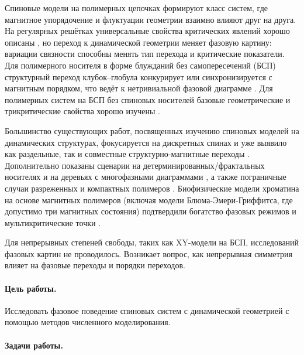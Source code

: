 Спиновые модели на полимерных цепочках формируют класс систем, где магнитное упорядочение и флуктуации геометрии взаимно влияют друг на друга. На регулярных решётках универсальные свойства критических явлений хорошо описаны \cite{cardy1996scaling,stanley1971introduction,baxter2013exactly,PELISSETTO2002549,kosterlitz1973ordering,pokrov}, но переход к динамической геометрии меняет фазовую картину: вариации связности способны менять тип перехода и критические показатели. Для полимерного носителя в форме блужданий без самопересечений (БСП) структурный переход клубок–глобула конкурирует или синхронизируется с магнитным порядком, что ведёт к нетривиальной фазовой диаграмме \cite{Garel_1999,PhysRevE.104.024122,PhysRevE.108.L042502}.
Для полимерных систем на БСП без спиновых носителей базовые геометрические и трикритические свойства хорошо изучены \cite{Rensburg,Vanderzande_1998,Scaling_concepts}.

Большинство существующих работ, посвященных изучению спиновых моделей на динамических структурах, фокусируется на дискретных спинах и уже выявило как раздельные, так и совместные структурно-магнитные переходы \cite{Garel_1999,PhysRevE.104.024122,faizullina2021critical1}. Дополнительно показаны сценарии на детерминированных/фрактальных носителях и на деревьях с многофазными диаграммами \cite{PhysRevE.106.024130,PhysRevE.108.L042502}, а также пограничные случаи разреженных и компактных полимеров \cite{papalerosa}. Биофизические модели хроматина на основе магнитных полимеров (включая  модели Блюма-Эмери-Гриффитса, где допустимо три магнитных состояния) подтвердили богатство фазовых режимов и мультикритические точки \cite{PhysRevX.6.041047,PhysRevE.100.052410,D5SM00212E}. 

Для непрерывных степеней свободы, таких как XY-модели на БСП, исследований фазовых картин не проводилось. Возникает вопрос, как непрерывная симметрия влияет на фазовые переходы и порядки переходов. 




\paragraph*{Цель работы.}

Исследовать фазовое поведение спиновых систем с динамической геометрией с помощью методов численного моделирования. 

\paragraph*{Задачи работы.}

